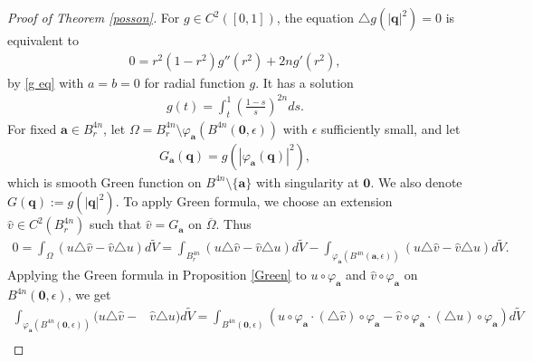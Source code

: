 \documentclass[a4paper,11pt]{amsart}
\numberwithin{equation}{section}
\begin{document}
\begin{proof}[Proof of Theorem \ref{posson}]
For $g\in C^2([0,1])$, the equation $\triangle g(|\mathbf{q}|^2)=0$ is equivalent to
\begin{equation}\begin{aligned}
0=r^2(1-r^2)g''(r^2)+2ng'(r^2),
\end{aligned}\end{equation}
by \eqref{g eq} with $a=b=0$ for radial function $g$. It has a solution
\begin{equation}\begin{aligned}\label{g}
g(t)=\int_{t}^{1}\left(\frac{1-s}{s}\right)^{2n}ds.
\end{aligned}\end{equation}
For fixed $\mathbf{a}\in B^{4n}_r$, let $\Omega=B_r^{4n} \setminus \varphi_{\mathbf{a}}(B^{4n}(\mathbf{0},\epsilon))$ with $\epsilon$ sufficiently small, and let
\begin{equation}\begin{aligned}\label{Ga}
G_{\mathbf{a}}(\mathbf{q})=g(|\varphi_{\mathbf{a}}(\mathbf{q})|^2),
\end{aligned}\end{equation}
which is smooth Green function on $B^{4n} \setminus \{\mathbf{a}\}$ with singularity at $\mathbf{0}$. We also denote $G(\mathbf{q}):=g(|\mathbf{q}|^2)$.
To apply Green formula, we choose an extension $\widehat{v}\in C^2(B_r^{4n})$ such that $\widehat{v}=G_{\mathbf{a}}$ on $\overline{\Omega}$.
Thus
\begin{equation}\begin{aligned}\label{total}
0=\int_{\Omega}(u\triangle \widehat{v}-\widehat{v}\triangle u) d\widetilde{V}=\int_{B^{4n}_r}(u\triangle \widehat{v}-\widehat{v}\triangle u) d\widetilde{V}-\int_{\varphi_{\mathbf{a}}(B^{4n}(\mathbf{a},\epsilon))}(u\triangle \widehat{v}-\widehat{v}\triangle u) d\widetilde{V}.
\end{aligned}\end{equation}
Applying the Green formula in Proposition \ref{Green} to $u\circ \varphi_{\mathbf{a}}$ and $\widehat{v}\circ \varphi_{\mathbf{a}}$ on $B^{4n}(\mathbf{0},\epsilon)$, we get
\begin{equation}\begin{aligned}\label{part ii}
\int_{\varphi_{\mathbf{a}}(B^{4n}(\mathbf{0},\epsilon))}(u\triangle\widehat{v}-&\widehat{v}\triangle u) d\widetilde{V}
=\int_{B^{4n}(\mathbf{0},\epsilon)}\left(u\circ\varphi_{\mathbf{a}}\cdot(\triangle \widehat{v})\circ\varphi_{\mathbf{a}}-\widehat{v}\circ\varphi_{\mathbf{a}}\cdot(\triangle u)\circ\varphi_{\mathbf{a}}\right) d\widetilde{V}\\

\end{aligned}
\end{equation}
\end{proof}
\end{document}
